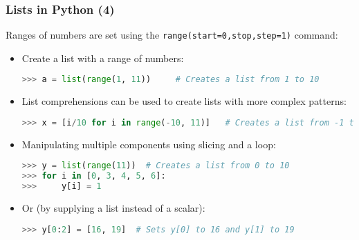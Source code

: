  \begin{frame}[fragile]
   \frametitle{Lists in Python (4)}
   Ranges of numbers are set using the \lstinline|range(start=0,stop,step=1)| command:
   \begin{itemize}
    \item Create a list with a range of numbers:
    \begin{lstlisting}[language=Python,numbers=none]
>>> a = list(range(1, 11))     # Creates a list from 1 to 10
    \end{lstlisting}
    \item List comprehensions can be used to create lists with more complex patterns:
    \begin{lstlisting}[language=Python,numbers=none]
>>> x = [i/10 for i in range(-10, 11)]   # Creates a list from -1 to 1 with a step of 0.1
    \end{lstlisting}
    \item Manipulating multiple components using slicing and a loop:
    \begin{lstlisting}[language=Python,numbers=none]
>>> y = list(range(11))  # Creates a list from 0 to 10
>>> for i in [0, 3, 4, 5, 6]: 
>>>     y[i] = 1
    \end{lstlisting}
    \item Or (by supplying a list instead of a scalar):
    \begin{lstlisting}[language=Python,numbers=none]
>>> y[0:2] = [16, 19]  # Sets y[0] to 16 and y[1] to 19
    \end{lstlisting}
  \end{itemize}
 \end{frame}

